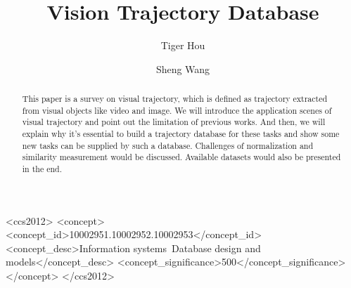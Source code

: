 \documentclass[sigconf]{acmart}
\begin{document}
\title{Vision Trajectory Database}




\author{Tiger Hou}

\author{Sheng Wang}



\begin{abstract}
This paper is a survey on visual trajectory, which is defined as trajectory extracted from visual objects like video and image. We will introduce the application scenes of visual trajectory and point out the limitation of previous works. And then, we will explain why it's essential to build a trajectory database for these tasks and show some new tasks can be supplied by such a database. Challenges of normalization and similarity measurement would be discussed. Available datasets would also be presented in the end.  
\end{abstract}

\begin{CCSXML}
	<ccs2012>
	<concept>
	<concept_id>10002951.10002952.10002953</concept_id>
	<concept_desc>Information systems~Database design and models</concept_desc>
	<concept_significance>500</concept_significance>
	</concept>
	</ccs2012>
\end{CCSXML}


\end{document}
